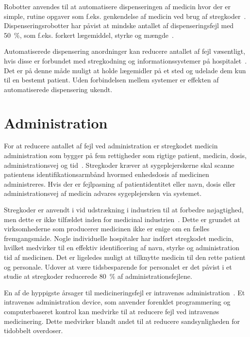 Robotter anvendes til at automatisere dispenseringen af medicin hvor der er simple, rutine opgaver som f.eks. genkendelse af medicin ved brug af stregkoder~\citep{Kaushal2002}. Dispenseringsrobotter har påvist at mindske antallet af dispenseringsfejl med 50~\%, som f.eks. forkert lægemiddel, styrke og mængde~\citep{Stephen2013}.

Automatiserede dispensering anordninger kan reducere antallet af fejl væsentligt, hvis disse er forbundet med stregkodning og informationssystemer på hospitalet~\citep{Bates2000a}. Det er på denne måde muligt at holde lægemidler på et sted og udelade dem kun til en bestemt patient. Uden forbindelsen mellem systemer er effekten af automatiserede dispensering ukendt.~\citep{Bates2000a} 

\section{Administration}
For at reducere antallet af fejl ved administration er stregkodet medicin administration som bygger på fem rettigheder som rigtige patient, medicin, dosis, administrationsvej og tid~\citep{Agrawal2009}. Stregkoder kræver at sygeplejerskerne skal scanne patientens identifikationsarmbånd hvormed enhedsdosis af medicinen administreres. Hvis der er fejlpasning af patientidentitet eller navn, dosis eller administrationsvej af medicin advares sygeplejersken via systemet.~\citep{Agrawal2009} 

Stregkoder er anvendt i vid udstrækning i industrien til at forbedre nøjagtighed, men dette er ikke tilfældet inden for medicinal industrien~\citep{Kaushal2002}. Dette er grundet at virksomhederne som producerer medicinen ikke er enige om en fælles fremgangsmåde. Nogle individuelle hospitaler har indført stregkodet medicin, hvilket medvirker til en effektiv identificering af navn, styrke og administration tid af medicinen. Det er ligeledes muligt at tilknytte medicin til den rette patient og personale. Udover at være tidsbesparende for personalet er det påvist i et studie at stregkoder reducerede 80~\% af administrationsfejlene.~\citep{Kaushal2002}

En af de hyppigste årsager til medicineringsfejl er intravenøs administration~\citep{Kaushal2002}. Et intravenøs administration device, som anvender forenklet programmering og computerbaseret kontrol kan medvirke til at reducere fejl ved intravenøs medicinering. Dette medvirker blandt andet til at reducere sandsynligheden for tidobbelt overdoser.~\citep{Kaushal2002}



